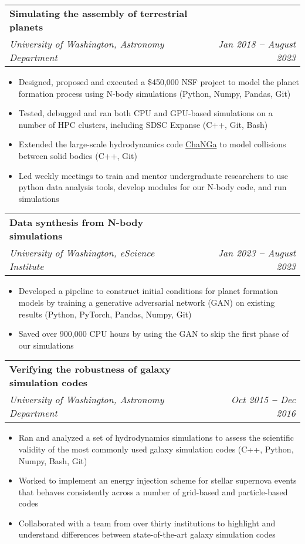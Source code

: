 \documentclass[letterpaper,11pt]{article}
\makeatletter
\newcommand{\resumeItem}[1]{
  \item\small{
    {#1 \vspace{-2pt}}
  }
}
\newcommand{\resumeSubheading}[4]{
  \vspace{-2pt}\item
    \begin{tabular*}{0.97\textwidth}[t]{l@{\extracolsep{\fill}}r}
      \textbf{#1} & #2 \\
      \textit{\small#3} & \textit{\small #4} \\
    \end{tabular*}\vspace{-7pt}
}
\newcommand{\resumeItemListStart}{\begin{itemize}}
\newcommand{\resumeItemListEnd}{\end{itemize}\vspace{-5pt}}
\makeatother
\begin{document}
    \resumeSubheading
      {Simulating the assembly of terrestrial planets}{}
      {University of Washington, Astronomy Department}{Jan 2018 \textbf{--} August 2023}
        \resumeItemListStart
        	    \resumeItem{Designed, proposed and executed a \$450,000 NSF project to model the planet formation process using N-body simulations (Python, Numpy, Pandas, Git)}
            \resumeItem{Tested, debugged and ran both CPU and GPU-based simulations on a number of HPC clusters, including SDSC Expanse (C++, Git, Bash)}
            \resumeItem{Extended the large-scale hydrodynamics code {\sc \href{https://github.com/N-BodyShop/changa}{ChaNGa}} to model collisions between solid bodies (C++, Git)}
            \resumeItem{Led weekly meetings to train and mentor undergraduate researchers to use python data analysis tools, develop modules for our N-body code, and run simulations}
        \resumeItemListEnd
        
      \resumeSubheading
      {Data synthesis from N-body simulations}{}
      {University of Washington, eScience Institute}{Jan 2023 \textbf{--} August 2023}
        \resumeItemListStart
        	   \resumeItem{Developed a pipeline to construct initial conditions for planet formation models by training a generative adversarial network (GAN) on existing results (Python, PyTorch, Pandas, Numpy, Git)}
            \resumeItem{Saved over 900,000 CPU hours by using the GAN to skip the first phase of our simulations}
        \resumeItemListEnd
        
            
 \resumeSubheading
      {Verifying the robustness of galaxy simulation codes}{}
      {University of Washington, Astronomy Department}{Oct 2015 \textbf{--} Dec 2016}
        \resumeItemListStart
            \resumeItem{Ran and analyzed a set of hydrodynamics simulations to assess the scientific validity of the most commonly used galaxy simulation codes (C++, Python, Numpy, Bash, Git)}
            \resumeItem{Worked to implement an energy injection scheme for stellar supernova events that behaves consistently across a number of grid-based and particle-based codes}
            \resumeItem{Collaborated with a team from over thirty institutions to highlight and understand differences between state-of-the-art galaxy simulation codes}
        \resumeItemListEnd
        
\end{document}
